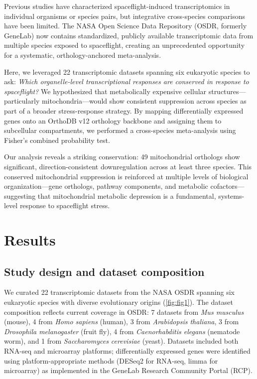 \documentclass[11pt,a4paper]{article}
\begin{document}
Previous studies have characterized spaceflight-induced transcriptomics in individual 
organisms or species pairs, but integrative cross-species comparisons have been limited. 
The NASA Open Science Data Repository (OSDR, formerly GeneLab) now contains standardized, 
publicly available transcriptomic data from multiple species exposed to spaceflight, 
creating an unprecedented opportunity for a systematic, orthology-anchored meta-analysis.

Here, we leveraged 22 transcriptomic datasets spanning six eukaryotic species to ask: 
\textit{Which organelle-level transcriptional responses are conserved in response to 
spaceflight?} We hypothesized that metabolically expensive cellular structures—particularly 
mitochondria—would show consistent suppression across species as part of a broader 
stress-response strategy. By mapping differentially expressed genes onto an 
OrthoDB v12 orthology backbone and assigning them to subcellular compartments, 
we performed a cross-species meta-analysis using Fisher's combined probability test.

Our analysis reveals a striking conservation: 49 mitochondrial orthologs show 
significant, direction-consistent downregulation across at least three species. 
This conserved mitochondrial suppression is reinforced at multiple levels of 
biological organization—gene orthologs, pathway components, and metabolic cofactors—
suggesting that mitochondrial metabolic depression is a fundamental, systems-level 
response to spaceflight stress.

\section{Results}
\label{sec:results}

\subsection{Study design and dataset composition}
\label{sec:results:design}

We curated 22 transcriptomic datasets from the NASA OSDR spanning six eukaryotic 
species with diverse evolutionary origins (\cref{fig:fig1}). The dataset composition 
reflects current coverage in OSDR: 7 datasets from \textit{Mus musculus} (mouse), 
4 from \textit{Homo sapiens} (human), 3 from \textit{Arabidopsis thaliana}, 
3 from \textit{Drosophila melanogaster} (fruit fly), 4 from \textit{Caenorhabditis elegans} 
(nematode worm), and 1 from \textit{Saccharomyces cerevisiae} (yeast). 
Datasets included both RNA-seq and microarray platforms; differentially expressed 
genes were identified using platform-appropriate methods (DESeq2 for RNA-seq, 
limma for microarray) as implemented in the GeneLab Research Community Portal (RCP).
\end{document}
